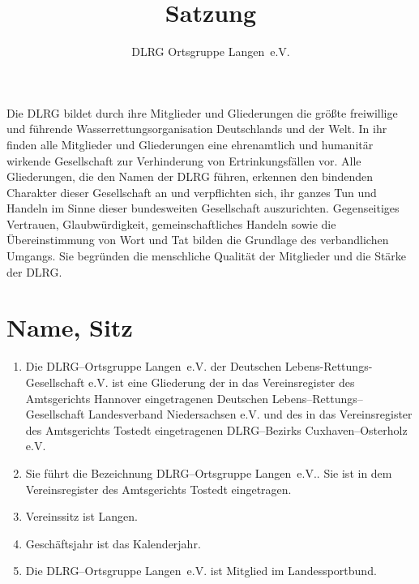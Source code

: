 \documentclass[%
12pt, %
a4paper, %
headsepline, %
footsepline, %
parskip, %
headings=normal, %
]{scrartcl}
\author{DLRG Ortsgruppe Langen~e.V.}
\title{Satzung}
\subtitle{}
\date{}
\begin{document}
\maketitle
\vspace{-0.3cm}

Die DLRG bildet durch ihre Mitglieder und Gliederungen die größte freiwillige und führende Wasserrettungsorganisation Deutschlands und der Welt. In ihr finden alle Mitglieder und Gliederungen eine ehrenamtlich und humanitär wirkende Gesellschaft zur Verhinderung von Ertrinkungsfällen vor. Alle Gliederungen, die den Namen der DLRG führen, erkennen den bindenden Charakter dieser Gesellschaft an und verpflichten sich, ihr ganzes Tun und Handeln im Sinne dieser bundesweiten Gesellschaft auszurichten. Gegenseitiges Vertrauen, Glaubwürdigkeit, gemeinschaftliches Handeln sowie die Übereinstimmung von Wort und Tat bilden die Grundlage des verbandlichen Umgangs. Sie begründen die menschliche Qualität der Mitglieder und die Stärke der DLRG.

\section{Name, Sitz}
\label{sec:name_sitz}
\begin{enumerate}
    \item Die DLRG--Ortsgruppe Langen~e.V. der Deutschen Lebens-Rettungs-Gesellschaft e.V. ist eine Gliederung der in das Vereinsregister des Amtsgerichts Hannover eingetragenen Deutschen Lebens--Rettungs--Gesellschaft Landesverband Niedersachsen e.V. und des in das Vereinsregister des Amtsgerichts Tostedt eingetragenen DLRG--Bezirks Cuxhaven--Osterholz e.V.
    \item Sie führt die Bezeichnung \glqq{}DLRG--Ortsgruppe Langen~e.V.\grqq{}. Sie ist in dem Vereinsregister des Amtsgerichts Tostedt eingetragen.
    \item Vereinssitz ist Langen.
    \item Geschäftsjahr ist das Kalenderjahr.
    \item Die DLRG--Ortsgruppe Langen~e.V. ist Mitglied im Landessportbund.
\end{enumerate}
\end{document}
